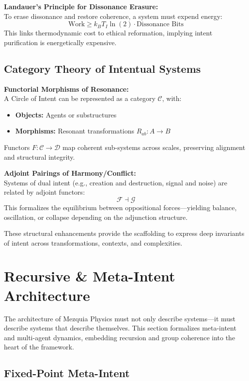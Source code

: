 \documentclass[12pt]{article}
\begin{document}
\textbf{Landauer’s Principle for Dissonance Erasure:} \\
To erase dissonance and restore coherence, a system must expend energy:
\[
\text{Work} \geq k_B T_I \ln(2) \cdot \text{Dissonance Bits}
\]
This links thermodynamic cost to ethical reformation, implying intent purification is energetically expensive.

\subsection{Category Theory of Intentual Systems}

\textbf{Functorial Morphisms of Resonance:} \\
A Circle of Intent can be represented as a category \(\mathcal{C}\), with:
\begin{itemize}
  \item \textbf{Objects:} Agents or substructures
  \item \textbf{Morphisms:} Resonant transformations \(R_{ab}: A \rightarrow B\)
\end{itemize}
Functors \(F: \mathcal{C} \rightarrow \mathcal{D}\) map coherent sub-systems across scales, preserving alignment and structural integrity.

\textbf{Adjoint Pairings of Harmony/Conflict:} \\
Systems of dual intent (e.g., creation and destruction, signal and noise) are related by adjoint functors:
\[
\mathcal{F} \dashv \mathcal{G}
\]
This formalizes the equilibrium between oppositional forces—yielding balance, oscillation, or collapse depending on the adjunction structure.

These structural enhancements provide the scaffolding to express deep invariants of intent across transformations, contexts, and complexities.

\section{Recursive \& Meta-Intent Architecture}

The architecture of Mezquia Physics must not only describe systems—it must describe systems that describe themselves. This section formalizes meta-intent and multi-agent dynamics, embedding recursion and group coherence into the heart of the framework.

\subsection{Fixed-Point Meta-Intent}
\end{document}
